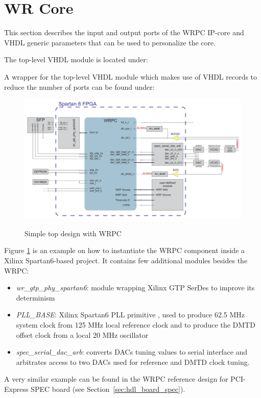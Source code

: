 \section{WR Core}
\label{sec:hdl_wrpc}
This section describes the input and output ports of the WRPC IP-core and VHDL generic parameters
that can be used to personalize the core.

The top-level VHDL module is located under:\\

A wrapper for the top-level VHDL module which makes use of VHDL records to reduce the number of
ports can be found under:\\

\begin{figure}
  \begin{center}
    \includegraphics[width=.9\textheight, angle=270]{fig/basic_top.pdf}
    \label{intro:fig:wrpc_top}
    \caption{Simple top design with WRPC}
  \end{center}
\end{figure}

Figure \ref{intro:fig:wrpc_top} is an example on how to instantiate the WRPC component inside a
Xilinx Spartan6-based project. It contains few additional modules besides the WRPC:
\begin{itemize}
  \item \emph{wr\_gtp\_phy\_spartan6}: module wrapping Xilinx GTP SerDes to improve its determinism
  \item \emph{PLL\_BASE}: Xilinx Spartan6 PLL primitive \cite{pll_base}, used to produce 62.5 MHz
    system clock from 125 MHz local reference clock and to produce the DMTD offset clock from a
    local 20 MHz oscillator
  \item \emph{spec\_serial\_dac\_arb}: converts DACs tuning values to serial interface and
    arbitrates access to two DACs used for reference and DMTD clock tuning.
\end{itemize}

A very similar example can be found in the WRPC reference design for PCI-Express SPEC board (see
Section~\ref{sec:hdl_board_spec}).










